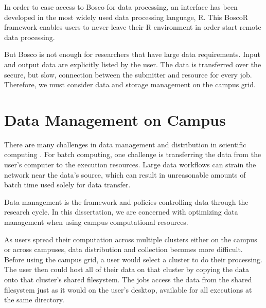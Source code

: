 In order to ease access to Bosco for data processing, an interface has been developed in the most widely used data processing language, R.  This BoscoR framework enables users to never leave their R environment in order start remote data processing.

But Bosco is not enough for researchers that have large data requirements.  Input and output data are explicitly listed by the user.  The data is transferred over the secure, but slow, connection between the submitter and resource for every job.  Therefore, we must consider data and storage management on the campus grid.










\section{Data Management on Campus}

There are many challenges in data management and distribution in scientific computing \cite{deelman2008data}.  For batch computing, one challenge is transferring the data from the user's computer to the execution resources.  Large data workflows can strain the network near the data's source, which can result in unreasonable amounts of batch time used solely for data transfer.

Data management is the framework and policies controlling data through the research cycle.  In this dissertation, we are concerned with optimizing data management when using campus computational resources.

As users spread their computation across multiple clusters either on the campus or across campuses, data distribution and collection becomes more difficult.  Before using the campus grid, a user would select a cluster to do their processing.  The user then could host all of their data on that cluster by copying the data onto that cluster's shared filesystem.  The jobs access the data from the shared filesystem just as it would on the user's desktop, available for all executions at the same directory.

